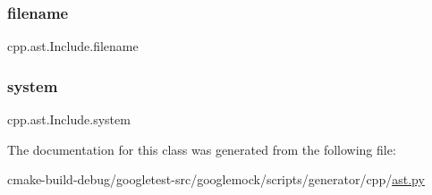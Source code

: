 \subsubsection{\texorpdfstring{filename}{filename}}
{\footnotesize\ttfamily cpp.\+ast.\+Include.\+filename}

\mbox{\label{classcpp_1_1ast_1_1Include_a2e8e535b1af7d9b0ff94d0ae9f86e5c5}} 
\subsubsection{\texorpdfstring{system}{system}}
{\footnotesize\ttfamily cpp.\+ast.\+Include.\+system}



The documentation for this class was generated from the following file\+:\begin{DoxyCompactItemize}
\item 
cmake-\/build-\/debug/googletest-\/src/googlemock/scripts/generator/cpp/\mbox{\hyperlink{ast_8py}{ast.\+py}}\end{DoxyCompactItemize}
